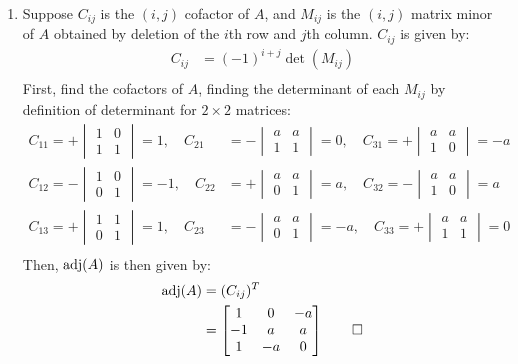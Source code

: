 \documentclass[12pt, a4paper]{article}
\begin{document}
\begin{enumerate}[Q\arabic*.]
\begin{enumerate}[(\alph*)]
\begin{enumerate}[(\roman*)]
          \item Suppose $C_{ij}$ is the $(i, j)$ cofactor of $A$, and $M_{ij}$ is the $(i, j)$ matrix minor of $A$ obtained by deletion of the $i$th row and $j$th column. $C_{ij}$ is given by:
            \begin{align*}
              C_{ij} &= (-1)^{i+j}\det(M_{ij})\\
            \end{align*}
          First, find the cofactors of $A$, finding the determinant of each $M_{ij}$ by definition of determinant for $2\times2$ matrices:
            \begin{align*}
              C_{11} = +\begin{vmatrix}1&0\\1&1\end{vmatrix} = 1               ,\quad C_{21} &= -\begin{vmatrix}a&a\\1&1\end{vmatrix} = 0
              ,\quad C_{31} = +\begin{vmatrix}a&a\\1&0\end{vmatrix} = -a\\
              C_{12} = -\begin{vmatrix}1&0\\0&1\end{vmatrix} = -1
              ,\quad C_{22} &= +\begin{vmatrix}a&a\\0&1\end{vmatrix} = a
              ,\quad C_{32} = -\begin{vmatrix}a&a\\1&0\end{vmatrix} = a\\
              C_{13} = +\begin{vmatrix}1&1\\0&1\end{vmatrix} = 1
              ,\quad C_{23} &= -\begin{vmatrix}a&a\\0&1\end{vmatrix} = -a
              ,\quad C_{33} = +\begin{vmatrix}a&a\\1&1\end{vmatrix} = 0\\
            \end{align*}
            Then, $\operatorname{adj}(A)$ is then given by:
            \begin{align*}
              \operatorname{adj}(A) &= (C_{ij})^T\\
                      &= \begin{bmatrix}1&0&-a\\-1&a&a\\1&-a&0\end{bmatrix}\qed
            \end{align*}
      

\end{enumerate}
\end{enumerate}
\end{enumerate}
\end{document}
